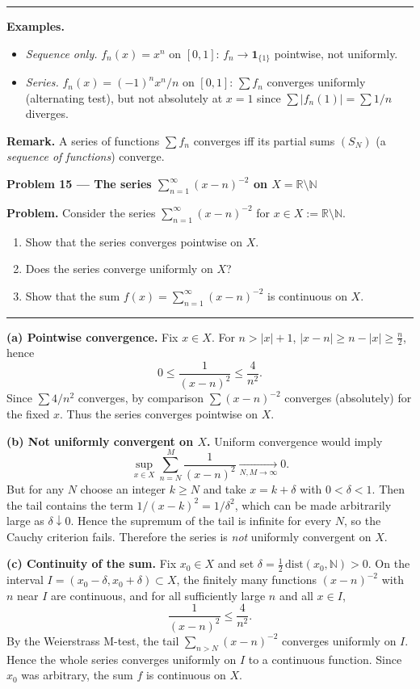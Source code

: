 \documentclass[12pt,a4paper]{article}
\theoremstyle{plain}
\theoremstyle{definition}
\theoremstyle{remark}
\theoremstyle{remark}
\newcommand{\probheader}[1]{%
	\par\vspace{8pt}%
	{\Large\bfseries #1\par}%
	\vspace{6pt}%
}
\newcommand{\sep}{\vspace{6pt}\hrule\vspace{8pt}}
\begin{document}
	\sep
	
	\textbf{Examples.}
	\begin{itemize}
		\item \emph{Sequence only.} $f_n(x)=x^n$ on $[0,1]$: $f_n\to \mathbf{1}_{\{1\}}$ pointwise, not uniformly.
		\item \emph{Series.} $f_n(x)=(-1)^n x^n/n$ on $[0,1]$:
		$\sum f_n$ converges uniformly (alternating test),
		but not absolutely at $x=1$ since $\sum |f_n(1)|=\sum 1/n$ diverges.
	\end{itemize}
	
	\textbf{Remark.} A series of functions $\sum f_n$ converges iff its partial sums
	$(S_N)$ (a \emph{sequence of functions}) converge.
	\probheader{Problem 15 — The series $\sum_{n=1}^{\infty}(x-n)^{-2}$ on $X=\mathbb{R}\setminus\mathbb{N}$}
	
	\textbf{Problem.}
	Consider the series $\sum_{n=1}^\infty (x-n)^{-2}$ for $x\in X:=\mathbb{R}\setminus\mathbb{N}$.
	\begin{enumerate}[label=(\alph*), leftmargin=1.2cm]
		\item Show that the series converges pointwise on $X$.
		\item Does the series converge uniformly on $X$?
		\item Show that the sum $f(x)=\sum_{n=1}^\infty (x-n)^{-2}$ is continuous on $X$.
	\end{enumerate}
	
	\sep
	
	\textbf{(a) Pointwise convergence.}
	Fix $x\in X$.
	For $n>\lvert x\rvert+1$,
	$|x-n|\ge n-\lvert x\rvert\ge \tfrac{n}{2}$, hence
	\[
	0\le \frac{1}{(x-n)^2}\le \frac{4}{n^2}.
	\]
	Since $\sum 4/n^2$ converges, by comparison $\sum (x-n)^{-2}$ converges (absolutely) for the fixed $x$.
	Thus the series converges pointwise on $X$.
	
	\medskip
	
	\textbf{(b) Not uniformly convergent on $X$.}
	Uniform convergence would imply
	\[
	\sup_{x\in X}\sum_{n=N}^{M}\frac{1}{(x-n)^2}\xrightarrow[N,M\to\infty]{}0.
	\]
	But for any $N$ choose an integer $k\ge N$ and take $x=k+\delta$ with $0<\delta<1$.
	Then the tail contains the term $1/(x-k)^2=1/\delta^2$, which can be made arbitrarily large as $\delta\downarrow0$.
	Hence the supremum of the tail is infinite for every $N$, so the Cauchy criterion fails.
	Therefore the series is \emph{not} uniformly convergent on $X$.
	
	\medskip
	
	\textbf{(c) Continuity of the sum.}
	Fix $x_0\in X$ and set $\delta=\tfrac12\,\mathrm{dist}(x_0,\mathbb{N})>0$.
	On the interval $I=(x_0-\delta,x_0+\delta)\subset X$, the finitely many functions
	$(x-n)^{-2}$ with $n$ near $I$ are continuous, and for all sufficiently large $n$ and all $x\in I$,
	\[
	\frac{1}{(x-n)^2}\le \frac{4}{n^2}.
	\]
	By the Weierstrass M-test, the tail $\sum_{n>N}(x-n)^{-2}$ converges uniformly on $I$.
	Hence the whole series converges uniformly on $I$ to a continuous function.
	Since $x_0$ was arbitrary, the sum $f$ is continuous on $X$.
	
\end{document}
